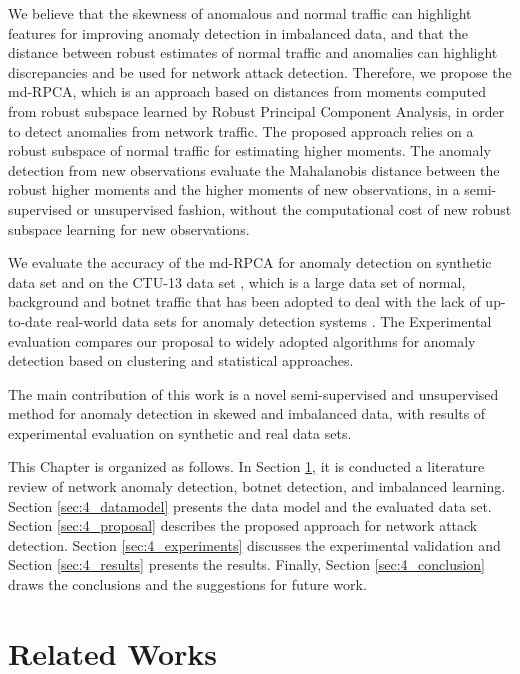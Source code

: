 We believe that the skewness of anomalous and normal traffic can highlight features for improving anomaly detection in imbalanced data, 
and that the distance between robust estimates of normal traffic and anomalies can highlight discrepancies and be used for network attack detection. Therefore, we propose the md-RPCA, which is an approach based on distances from moments computed from robust subspace learned by Robust Principal Component Analysis, in order to detect anomalies from network traffic. The proposed approach relies on a robust subspace of normal traffic for estimating higher moments. The anomaly detection from new observations evaluate the Mahalanobis distance between the robust higher moments and the higher moments of new observations, in a semi-supervised or unsupervised fashion, without the computational cost of new robust subspace learning for new observations.

We evaluate the accuracy of the md-RPCA for anomaly detection on synthetic data set and on the CTU-13 data set \cite{garcia2014empirical}, which is a large data set of normal, background and botnet traffic that has been adopted to deal with the lack of up-to-date real-world data sets for anomaly detection systems \cite{osanaiye2016distributed}. The Experimental evaluation compares our proposal to widely adopted algorithms for anomaly detection based on clustering and statistical approaches. 


The main contribution of this work is a novel semi-supervised and unsupervised method for anomaly detection in skewed and imbalanced data, with results of experimental evaluation on synthetic and real data sets.

This Chapter is organized as follows. In Section \ref{sec:4_relatedworks}, it is conducted a literature review of network anomaly detection, botnet detection, and imbalanced learning. Section \ref{sec:4_datamodel} presents the data model and the evaluated data set. Section \ref{sec:4_proposal} describes the proposed approach for network attack detection. Section \ref{sec:4_experiments} discusses the experimental validation and Section \ref{sec:4_results} presents the results. Finally, Section \ref{sec:4_conclusion} draws the conclusions and the suggestions for future work.


\section{Related Works}
\label{sec:4_relatedworks}

